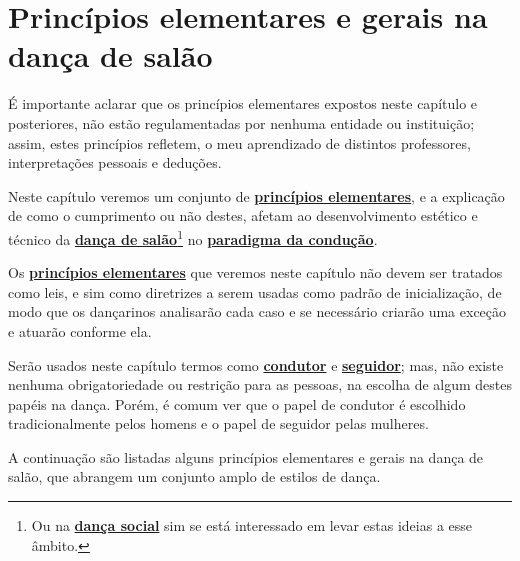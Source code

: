 \newpage
\section{Princípios elementares e gerais na dança de salão}
\label{sec:PrincipioGeral}


\begin{tcbattention}
É importante aclarar
que os princípios elementares expostos neste capítulo e posteriores, 
não estão regulamentadas por nenhuma entidade ou instituição; assim, 
estes princípios refletem, o meu aprendizado de distintos professores,
interpretações pessoais  e deduções. 
\end{tcbattention}

Neste capítulo veremos um conjunto de \hyperref[def:Principio]{\textbf{princípios elementares}}, 
e a explicação de como o cumprimento ou não destes, 
afetam ao desenvolvimento estético e técnico da \hyperref[def:DancaSalao]{\textbf{dança de 
salão}}\footnote{Ou na \hyperref[def:DancaSocial]{\textbf{dança social}} sim se está interessado em levar estas ideias a esse âmbito.}  no \hyperref[def:ParadigmaConducao]{\textbf{paradigma da condução}}.

Os \hyperref[def:Principio]{\textbf{princípios elementares}} que veremos neste capítulo não devem ser
tratados como leis, e sim como diretrizes a serem usadas como padrão de inicialização, de modo que 
os dançarinos analisarão cada caso e se necessário criarão uma exceção e atuarão conforme ela.

Serão usados neste capítulo termos como \hyperref[def:Condutor]{\textbf{condutor}} e \hyperref[def:Seguidor]{\textbf{seguidor}}; 
mas, não existe nenhuma obrigatoriedade ou restrição para as pessoas, 
na escolha de algum destes papéis na dança.
Porém, é comum ver que o papel de condutor é escolhido tradicionalmente pelos homens e o papel de seguidor pelas mulheres.

A continuação são listadas alguns princípios elementares e gerais na dança de salão, 
que abrangem um conjunto amplo de estilos de dança.\\

